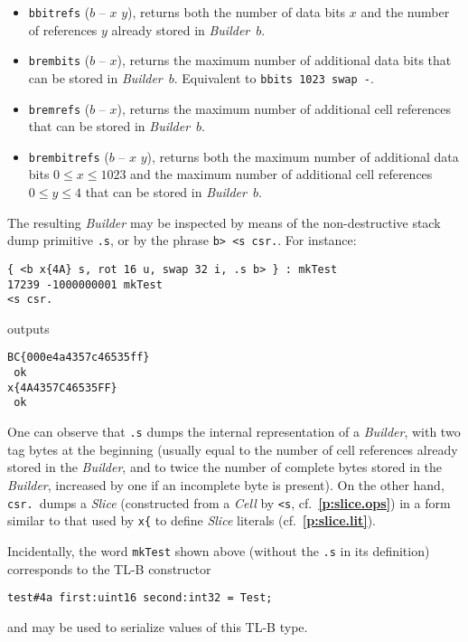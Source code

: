 \documentclass[12pt,oneside]{article}
\def\refpoint#1{{\rm\textbf{\ref{#1}}}}
\let\ptref=\refpoint
\begin{document}
\begin{itemize}
\item {\tt bbitrefs} ($b$ -- $x$ $y$), returns both the number of data bits $x$ and the number of references $y$ already stored in {\em Builder\/}~$b$.
\item {\tt brembits} ($b$ -- $x$), returns the maximum number of additional data bits that can be stored in {\em Builder\/}~$b$. Equivalent to {\tt bbits 1023 swap -}.
\item {\tt bremrefs} ($b$ -- $x$), returns the maximum number of additional cell references that can be stored in {\em Builder\/}~$b$.
\item {\tt brembitrefs} ($b$ -- $x$ $y$), returns both the maximum number of additional data bits $0\leq x\leq 1023$ and the maximum number of additional cell references $0\leq y\leq 4$ that can be stored in {\em Builder\/}~$b$.
\end{itemize}

The resulting {\em Builder\/} may be inspected by means of the non-destructive stack dump primitive {\tt .s}, or by the phrase {\tt b> <s csr.}. For instance:
\begin{verbatim}
{ <b x{4A} s, rot 16 u, swap 32 i, .s b> } : mkTest
17239 -1000000001 mkTest
<s csr.
\end{verbatim}
outputs
\begin{verbatim}
BC{000e4a4357c46535ff}
 ok
x{4A4357C46535FF}
 ok
\end{verbatim}
One can observe that {\tt .s} dumps the internal representation of a {\em Builder}, with two tag bytes at the beginning (usually equal to the number of cell references already stored in the {\em Builder}, and to twice the number of complete bytes stored in the {\em Builder}, increased by one if an incomplete byte is present). On the other hand, {\tt csr.\ }dumps a {\em Slice\/} (constructed from a {\em Cell\/} by {\tt <s}, cf.~\ptref{p:slice.ops}) in a form similar to that used by {\tt x\{} to define {\em Slice\/} literals (cf.~\ptref{p:slice.lit}).

Incidentally, the word {\tt mkTest} shown above (without the {\tt .s} in its definition) corresponds to the TL-B constructor
\begin{verbatim}
test#4a first:uint16 second:int32 = Test;
\end{verbatim}
and may be used to serialize values of this TL-B type.
\end{document}
